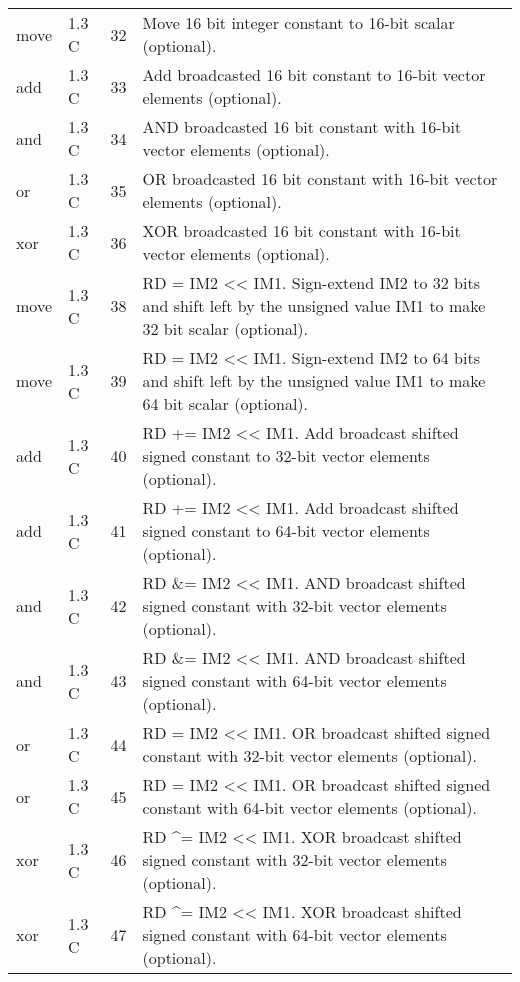 \documentclass[forwardcom.tex]{subfiles}
\begin{document}
\begin{longtable} {|p{20mm}|p{10mm}|p{8mm}|p{75mm}|}
move          & 1.3 C & 32 & Move 16 bit integer constant to 16-bit scalar (optional). \\
add           & 1.3 C & 33 & Add broadcasted 16 bit constant to 16-bit vector elements (optional). \\
and           & 1.3 C & 34 & AND broadcasted 16 bit constant with 16-bit vector elements (optional). \\
or            & 1.3 C & 35 & OR broadcasted 16 bit constant with 16-bit vector elements (optional). \\
xor           & 1.3 C & 36 & XOR broadcasted 16 bit constant with 16-bit vector elements (optional). \\
move          & 1.3 C & 38 & RD = IM2 \textless\textless{} IM1. Sign-extend IM2 to 32 bits and shift left by the unsigned value IM1 to make 32 bit scalar (optional). \\
move          & 1.3 C & 39 & RD = IM2 \textless\textless{} IM1. Sign-extend IM2 to 64 bits and shift left by the unsigned value IM1 to make 64 bit scalar (optional). \\
add           & 1.3 C & 40 & RD += IM2 \textless\textless{} IM1. Add broadcast shifted signed constant to 32-bit vector elements (optional). \\
add           & 1.3 C & 41 & RD += IM2 \textless\textless{} IM1. Add broadcast shifted signed constant to 64-bit vector elements (optional). \\
and           & 1.3 C & 42 & RD \&= IM2 \textless\textless{} IM1. AND broadcast shifted signed constant with 32-bit vector elements (optional). \\
and           & 1.3 C & 43 & RD \&= IM2 \textless\textless{} IM1. AND broadcast shifted signed constant with 64-bit vector elements (optional). \\
or            & 1.3 C & 44 & RD \textbar{}= IM2 \textless\textless{} IM1. OR broadcast shifted signed constant with 32-bit vector elements (optional). \\
or            & 1.3 C & 45 & RD \textbar{}= IM2 \textless\textless{} IM1. OR broadcast shifted signed constant with 64-bit vector elements (optional). \\
xor           & 1.3 C & 46 & RD \^{}= IM2 \textless\textless{} IM1. XOR broadcast shifted signed constant with 32-bit vector elements (optional). \\
xor           & 1.3 C & 47 & RD \^{}= IM2 \textless\textless{} IM1. XOR broadcast shifted signed constant with 64-bit vector elements (optional). \\

\end{longtable}
\end{document}
